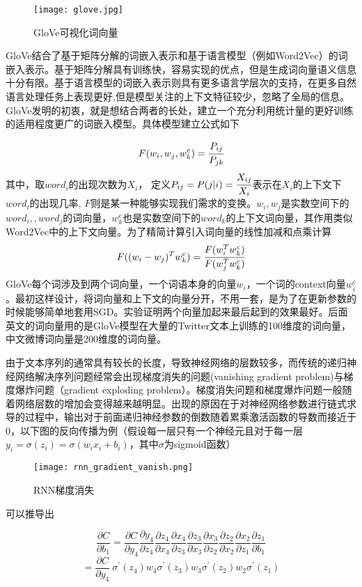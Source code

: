 \begin{figure}[htbp]
	\centering
	\texttt{[image: glove.jpg]}
	\caption[rnn_vanish]{GloVe可视化词向量}
\end{figure}

GloVe结合了基于矩阵分解的词嵌入表示和基于语言模型（例如Word2Vec）的词嵌入表示。基于矩阵分解具有训练快，容易实现的优点，但是生成词向量语义信息十分有限。基于语言模型的词嵌入表示则具有更多语言学层次的支持，在更多自然语言处理任务上表现更好,但是模型关注的上下文特征较少，忽略了全局的信息。GloVe发明的初衷，就是想结合两者的长处，建立一个充分利用统计量的更好训练的适用程度更广的词嵌入模型。具体模型建立公式如下

$$ F(w_i,w_j,w^c_k) = \cfrac{P_{ij}}{P_{jk}} $$
其中，取$word_i$的出现次数为$X_i$， 定义$P_{ij}=P(j|i)=\cfrac{X_{ij}}{X_{i}}$表示在$X_i$的上下文下$word_i$的出现几率, $F$则是某一种能够实现我们需求的变换。$w_i,w_j$是实数空间下的$word_i,,word_j$的词向量，$w^c_k$也是实数空间下的$word_k$的上下文词向量，其作用类似Word2Vec中的上下文向量。为了精简计算引入词向量的线性加减和点乘计算
$$ F((w_i-w_j)^Tw^c_k) = \cfrac{F(w^T_iw^c_k)}{{F(w^T_jw^c_k)}} $$
GloVe每个词涉及到两个词向量，一个词语本身的向量$w_i$，一个词的context向量$w^c_i$。最初这样设计，将词向量和上下文的向量分开，不用一套，是为了在更新参数的时候能够简单地套用SGD。实验证明两个向量加起来最后起到的效果最好。后面英文的词向量用的是GloVe模型在大量的Twitter文本上训练的100维度的词向量，中文微博词向量是200维度的词向量。

由于文本序列的通常具有较长的长度，导致神经网络的层数较多，而传统的递归神经网络解决序列问题经常会出现梯度消失的问题(vanishing gradient problem)与梯度爆炸问题（gradient exploding problem）。梯度消失问题和梯度爆炸问题一般随着网络层数的增加会变得越来越明显。出现的原因在于对神经网络参数进行链式求导的过程中，输出对于前面递归神经参数的倒数随着累乘激活函数的导数而接近于0，以下图的反向传播为例（假设每一层只有一个神经元且对于每一层$y_i=\sigma(z_i)=\sigma(w_ix_i+b_i)$，其中$\sigma$为sigmoid函数）

\begin{figure}[htbp]
	\centering
	\texttt{[image: rnn\_gradient\_vanish.png]}
	\caption[rnn_vanish]{RNN梯度消失}
\end{figure}

可以推导出

\begin{equation}\label{nodelimiter}
\frac{\partial C}{\partial b_1} = \frac{\partial C}{\partial y_4}\frac{\partial y_4}{\partial z_4}\frac{\partial z_4}{\partial x_4}\frac{\partial x_4}{\partial z_3}\frac{\partial z_3}{\partial x_3}\frac{\partial x_3}{\partial z_2}\frac{\partial z_2}{\partial x_2}\frac{\partial x_2}{\partial z_1}\frac{\partial z_1}{\partial b_1}
\end{equation}
\begin{equation}\label{delimiter}
=\frac{\partial C}{\partial y_4}\ \sigma ^\prime(z_4)w_4\sigma ^\prime(z_3)w_3\sigma ^\prime(z_2)w_2\sigma ^\prime(z_1)
\end{equation}

